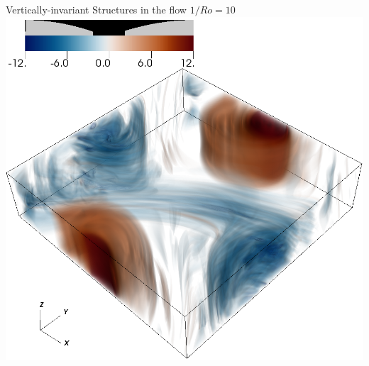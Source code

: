 \documentclass{beamer}
\begin{document}
\begin{frame}{Vertically-invariant Structures in the flow}
    \emp
        \centering
        $1/Ro = 10$
        \includegraphics[width=.95\textwidth]{images/vortz_Om10_vr2.png}
    \emp
\end{frame}
\end{document}
